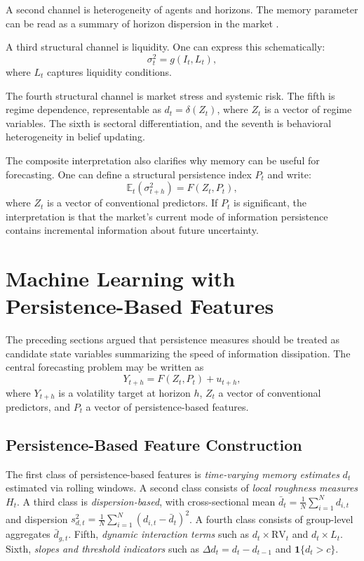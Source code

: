 \documentclass[12pt]{article}
\begin{document}
A second channel is heterogeneity of agents and horizons. The memory parameter can be read as a summary of horizon dispersion in the market \citep{Muller1997, Corsi2009}.

A third structural channel is liquidity. One can express this schematically:
\[
\sigma_t^2 = g(I_t, L_t),
\]
where $L_t$ captures liquidity conditions.

The fourth structural channel is market stress and systemic risk. The fifth is regime dependence, representable as $d_t = \delta(Z_t)$, where $Z_t$ is a vector of regime variables. The sixth is sectoral differentiation, and the seventh is behavioral heterogeneity in belief updating.

The composite interpretation also clarifies why memory can be useful for forecasting. One can define a structural persistence index $P_t$ and write:
\[
\mathbb{E}_t(\sigma_{t+h}^2) = F(Z_t, P_t),
\]
where $Z_t$ is a vector of conventional predictors. If $P_t$ is significant, the interpretation is that the market's current mode of information persistence contains incremental information about future uncertainty.

\section{Machine Learning with Persistence-Based Features}
\label{sec:ml}

The preceding sections argued that persistence measures should be treated as candidate state variables summarizing the speed of information dissipation. The central forecasting problem may be written as
\[
Y_{t+h} = F(Z_t, P_t) + u_{t+h},
\]
where $Y_{t+h}$ is a volatility target at horizon $h$, $Z_t$ a vector of conventional predictors, and $P_t$ a vector of persistence-based features.

\subsection{Persistence-Based Feature Construction}

The first class of persistence-based features is \emph{time-varying memory estimates} $d_t$ estimated via rolling windows. A second class consists of \emph{local roughness measures} $H_t$. A third class is \emph{dispersion-based}, with cross-sectional mean $\bar{d}_t = \frac{1}{N}\sum_{i=1}^{N} d_{i,t}$ and dispersion $s_{d,t}^2 = \frac{1}{N}\sum_{i=1}^{N}(d_{i,t} - \bar{d}_t)^2$. A fourth class consists of group-level aggregates $\bar{d}_{g,t}$. Fifth, \emph{dynamic interaction terms} such as $d_t \times \mathrm{RV}_t$ and $d_t \times L_t$. Sixth, \emph{slopes and threshold indicators} such as $\Delta d_t = d_t - d_{t-1}$ and $\mathbf{1}\{d_t > c\}$.
\end{document}
